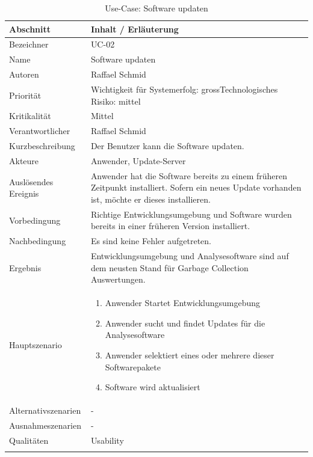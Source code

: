 \begin{longtable}{|p{4cm}|p{10.5cm}|}
\hline
   \textbf{Abschnitt} & \textbf{Inhalt / Erläuterung} \\\hline
   Bezeichner & UC-02\\\hline
   Name & Software updaten\\\hline
   Autoren & Raffael Schmid\\\hline
   Priorität & Wichtigkeit für Systemerfolg: gross\newline Technologisches Risiko: mittel\\\hline
   Kritikalität & Mittel\\\hline
   Verantwortlicher & Raffael Schmid\\\hline
   Kurzbeschreibung & Der Benutzer kann die Software updaten.\\\hline
   Akteure & Anwender, Update-Server\\\hline   
   Auslösendes Ereignis & Anwender hat die Software bereits zu einem früheren Zeitpunkt installiert. Sofern ein neues Update vorhanden ist, möchte er dieses installieren.\\\hline
   Vorbedingung & Richtige Entwicklungsumgebung und Software wurden bereits in einer früheren Version installiert.\\\hline
   Nachbedingung & Es sind keine Fehler aufgetreten.\\\hline
   Ergebnis & Entwicklungsumgebung und Analysesoftware sind auf dem neusten Stand für Garbage Collection Auswertungen.\\\hline
   Hauptszenario & 
	\begin{enumerate}
		\item Anwender Startet Entwicklungsumgebung
		\item Anwender sucht und findet Updates für die Analysesoftware
		\item Anwender selektiert eines oder mehrere dieser Softwarepakete
		\item Software wird aktualisiert
	\end{enumerate}
	\\\hline
   Alternativszenarien & -\\\hline
   Ausnahmeszenarien & -\\\hline
   Qualitäten & Usability\\\hline
\caption{Use-Case: Software updaten}
\end{longtable}

